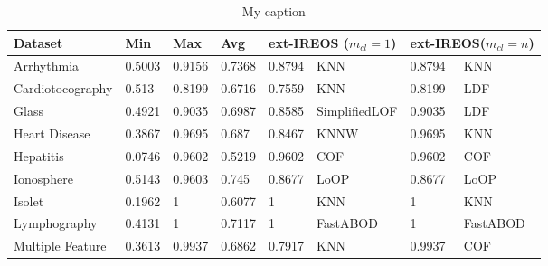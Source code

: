 \begin{table}[]
\centering
\caption{My caption}
\label{my-label}
\begin{tabular}{@{}llllllll@{}}
\toprule
\multicolumn{1}{l}{Dataset} & Min & Max & \multicolumn{1}{l}{Avg} & \multicolumn{2}{l}{ext-IREOS ($m_{cl} = 1$)} & \multicolumn{2}{l}{ext-IREOS($m_{cl} = n$)} \\ \midrule
\multicolumn{1}{l|}{Arrhythmia}        &  0.5003   &   0.9156  & \multicolumn{1}{l|}{0.7368}    &     0.8794     & \multicolumn{1}{l|}{KNN}         &         0.8794           &       KNN             \\
\multicolumn{1}{l|}{Cardiotocography}        &    0.513 &   0.8199  & \multicolumn{1}{l|}{0.6716}    &     0.7559     & \multicolumn{1}{l|}{KNN}         &     0.8199               &     LDF               \\
\multicolumn{1}{l|}{Glass}        &  0.4921   &  0.9035   & \multicolumn{1}{l|}{0.6987}    &     0.8585     & \multicolumn{1}{l|}{SimplifiedLOF}         &      0.9035              &        LDF            \\
\multicolumn{1}{l|}{Heart Disease}        &   0.3867  &  0.9695   & \multicolumn{1}{l|}{0.687}    &    0.8467      & \multicolumn{1}{l|}{KNNW}         &        0.9695            &      KNN              \\
\multicolumn{1}{l|}{Hepatitis}        &  0.0746   &  0.9602   & \multicolumn{1}{l|}{0.5219}    &     0.9602     & \multicolumn{1}{l|}{COF}         &           0.9602         &          COF          \\
\multicolumn{1}{l|}{Ionosphere}        &  0.5143   &  0.9603   & \multicolumn{1}{l|}{0.745}    &   0.8677       & \multicolumn{1}{l|}{LoOP}         &          0.8677          &        LoOP            \\
\multicolumn{1}{l|}{Isolet}        &  0.1962   &  1   & \multicolumn{1}{l|}{0.6077}    &     1     & \multicolumn{1}{l|}{KNN}         &            1        &               KNN     \\
\multicolumn{1}{l|}{Lymphography}        &   0.4131  &   1  & \multicolumn{1}{l|}{0.7117}    &     1     & \multicolumn{1}{l|}{FastABOD}         &              1      &          FastABOD          \\
\multicolumn{1}{l|}{Multiple Feature}        &  0.3613   &  0.9937   & \multicolumn{1}{l|}{0.6862}    &     0.7917     & \multicolumn{1}{l|}{KNN}         &       0.9937             &       COF             \\

\end{tabular}
\end{table}
